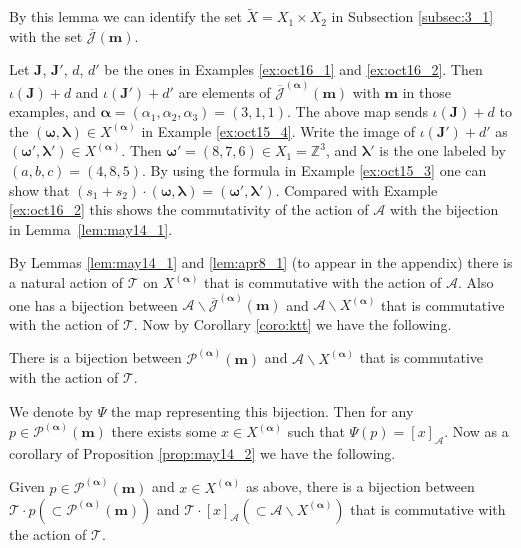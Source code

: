 \documentclass[pdftex]{sigma}
\newcommand{\Z}{{\mathbb Z}}
\newcommand{\Jb}{{\overline{\mathcal J}}}
\newcommand\bom{\boldsymbol{\omega}}
\newcommand\bol{\boldsymbol{\lambda}}
\newcommand\boa{\boldsymbol{\alpha}}
\newcommand{\m}{{\boldsymbol m}}
\newcommand{\boJ}{{\boldsymbol J}}
\begin{document}
By this lemma we can identify the set $\tilde{X} = X_1 \times X_2$ in Subsection \ref{subsec:3_1}
with the set
$\Jb (\m)$.

\begin{example}\label{ex:oct16_3}
Let $\boJ$, $\boJ'$, $d$, $d'$ be the ones in Examples \ref{ex:oct16_1} and \ref{ex:oct16_2}.
Then
$\iota (\boJ) + d$ and $\iota (\boJ') + d'$ are elements of $\Jb^{(\boa)} (\m)$ with
$\m$ in those examples, and $\boa = (\alpha_1, \alpha_2, \alpha_3) = (3,1,1)$.
%
The above map sends $\iota (\boJ) + d$ to the $(\bom, \bol) \in X^{(\boa)}$ in Example \ref{ex:oct15_4}.
Write the image of $\iota (\boJ') + d'$ as $(\bom', \bol') \in X^{(\boa)}$.
Then $\bom' = (8,7,6) \in X_1 = \Z^3$, and $\bol'$ is the one labeled by $(a,b,c) = (4,8,5)$.
%
By using the formula in Example \ref{ex:oct15_3} one can show that $(s_1 + s_2) \cdot (\bom, \bol) = (\bom', \bol')$.
Compared with Example \ref{ex:oct16_2} this shows the commutativity of the action of ${\mathcal A}$ with
the bijection in Lemma~\ref{lem:may14_1}.
\end{example}

By Lemmas \ref{lem:may14_1} and \ref{lem:apr8_1} (to appear in the appendix)
there is a natural action of ${\mathcal T}$ on $X^{(\boa)}$ that is commutative with the action of ${\mathcal A}$.
Also one has a bijection between {${\mathcal A} \backslash \Jb^{(\boa)} (\m)$} and
${\mathcal A} \backslash X^{(\boa)}$ that is commutative with the action of ${\mathcal T}$.
Now by Corollary \ref{coro:ktt} we have the following.
\begin{proposition}\label{prop:may14_2}
There is a bijection between ${\mathcal P}^{(\boa)}(\m)$ and ${\mathcal A} \backslash X^{(\boa)}$
that is commutative with the action of ${\mathcal T}$.
\end{proposition}
{We denote by $\Psi$ the map representing this bijection.
Then for any $p \in {\mathcal P}^{(\boa)}(\m)$ there exists some $x \in X^{(\boa)}$ such that
$\Psi (p) =  [x]_{\mathcal A}$.
Now as a corollary of Proposition \ref{prop:may14_2} we have the following.}
\begin{proposition}\label{prop:apr22_3}
Given $p \in {\mathcal P}^{(\boa)}(\m)$ and $x \in X^{(\boa)}$ as above,
there is a bijection between ${\mathcal T} \cdot p (\subset {\mathcal P}^{(\boa)}(\m))$
and ${\mathcal T} \cdot  [x]_{\mathcal A} (\subset {\mathcal A} \backslash X^{(\boa)})$
that is commutative with the action of ${\mathcal T}$.
\end{proposition}
\end{document}
